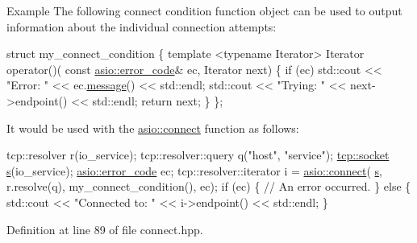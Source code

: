 \begin{DoxyParagraph}{Example}
The following connect condition function object can be used to output information about the individual connection attempts\+: 
\begin{DoxyCode}
 \textcolor{keyword}{struct }my\_connect\_condition
\{
  \textcolor{keyword}{template} <\textcolor{keyword}{typename} Iterator>
  Iterator operator()(
      \textcolor{keyword}{const} \hyperlink{classasio_1_1error__code}{asio::error\_code}& ec,
      Iterator next)
  \{
    \textcolor{keywordflow}{if} (ec) std::cout << \textcolor{stringliteral}{"Error: "} << ec.\hyperlink{classasio_1_1error__code_a9e15b346b9ec23275530835d9c150711}{message}() << std::endl;
    std::cout << \textcolor{stringliteral}{"Trying: "} << next->endpoint() << std::endl;
    \textcolor{keywordflow}{return} next;
  \}
\}; 
\end{DoxyCode}
 It would be used with the \hyperlink{group__connect_ga29acd61d7a875cef7dbd1f892be2906c}{asio\+::connect} function as follows\+: 
\begin{DoxyCode}
 tcp::resolver r(io\_service);
tcp::resolver::query q(\textcolor{stringliteral}{"host"}, \textcolor{stringliteral}{"service"});
\hyperlink{namespacewebsocketpp_1_1transport_1_1asio_1_1socket_1_1error_a828ddaa5ed63a761e1b557465a35f05aa0c31b356014843e1d09514e794a539a7}{tcp::socket} \hyperlink{group__async__connect_ga31ab74b9ea6c77932dddd016cfc7920a}{s}(io\_service);
\hyperlink{classasio_1_1error__code}{asio::error\_code} ec;
tcp::resolver::iterator i = \hyperlink{group__connect_ga29acd61d7a875cef7dbd1f892be2906c}{asio::connect}(
    \hyperlink{group__async__connect_ga31ab74b9ea6c77932dddd016cfc7920a}{s}, r.resolve(q), my\_connect\_condition(), ec);
\textcolor{keywordflow}{if} (ec)
\{
  \textcolor{comment}{// An error occurred.}
\}
\textcolor{keywordflow}{else}
\{
  std::cout << \textcolor{stringliteral}{"Connected to: "} << i->endpoint() << std::endl;
\} 
\end{DoxyCode}
 
\end{DoxyParagraph}


Definition at line 89 of file connect.\+hpp.

\hypertarget{group__connect_ga85284052d2233e8ea3993625e9f28184}{}
